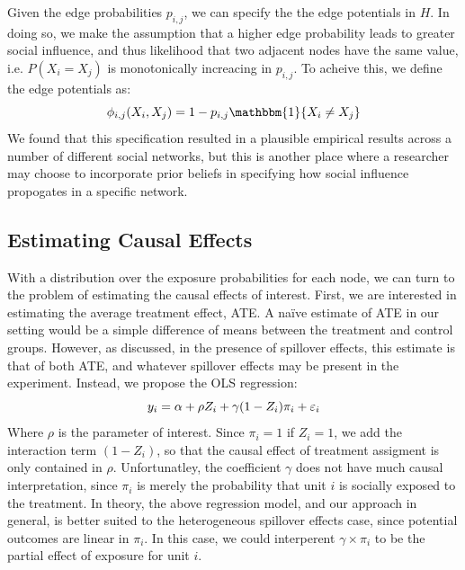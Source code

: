 \documentclass{article}
\begin{document}
Given the edge probabilities $p_{i,j}$, we can specify the the edge potentials in $H$. In doing so, 
we make the assumption that a higher edge probability leads to greater social influence, and thus likelihood that two adjacent nodes 
have the same value, i.e. $P(X_i = X_j)$ is monotonically increacing in $p_{i,j}$. To acheive this, we define the edge potentials as:
\begin{displaymath}
  \phi_{i,j}(X_i, X_j) = 1 - p_{i,j}\mathbbm{1}\{{X_i \neq X_j}\} \\[0.5ex]
\end{displaymath}
We found that this specification resulted in a plausible empirical results across a number of different social networks, but this is another place where a researcher may choose to 
incorporate prior beliefs in specifying how social influence propogates in a specific network.

\subsection{Estimating Causal Effects}

With a distribution over the exposure probabilities for each node, we can turn to the problem of estimating the causal effects of interest. 
First, we are interested in estimating the average treatment effect, ATE. A naïve estimate of ATE in our setting would be a simple difference of means 
between the treatment and control groups. However, as discussed, in the presence of spillover effects, this estimate is that of both ATE, and whatever spillover 
effects may be present in the experiment. Instead, we propose the OLS regression: 
\begin{equation}
  y_i = \alpha + \rho Z_i + \gamma (1 - Z_i) \pi_i + \varepsilon_i \\[1.0ex]
\end{equation}
Where $\rho$ is the parameter of interest. Since $\pi_i = 1$ if $Z_i = 1$, we add the interaction term $(1 - Z_i)$, so that the causal effect of
treatment assigment is only contained in $\rho$. Unfortunatley, the coefficient $\gamma$ does not have much causal interpretation, since $\pi_i$ is merely the probability that unit $i$
is socially exposed to the treatment. In theory, the above regression model, and our approach in general, is better suited to the heterogeneous spillover effects case, since potential outcomes are linear in $\pi_i$. 
In this case, we could interperent $\gamma \times \pi_i$ to be the partial effect of exposure for unit $i$. 
\end{document}
